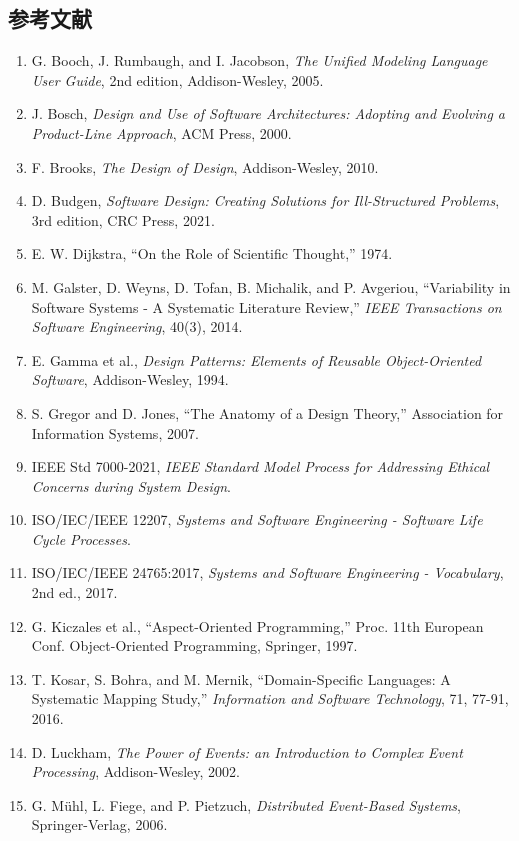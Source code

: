 \subsection{参考文献}

\begin{enumerate}
  \item G. Booch, J. Rumbaugh, and I. Jacobson, \textit{The Unified Modeling Language User Guide}, 2nd edition, Addison-Wesley, 2005.
  \item J. Bosch, \textit{Design and Use of Software Architectures: Adopting and Evolving a Product-Line Approach}, ACM Press, 2000.
  \item F. Brooks, \textit{The Design of Design}, Addison-Wesley, 2010.
  \item D. Budgen, \textit{Software Design: Creating Solutions for Ill-Structured Problems}, 3rd edition, CRC Press, 2021.
  \item E. W. Dijkstra, “On the Role of Scientific Thought,” 1974.
  \item M. Galster, D. Weyns, D. Tofan, B. Michalik, and P. Avgeriou, “Variability in Software Systems - A Systematic Literature Review,” \textit{IEEE Transactions on Software Engineering}, 40(3), 2014.
  \item E. Gamma et al., \textit{Design Patterns: Elements of Reusable Object-Oriented Software}, Addison-Wesley, 1994.
  \item S. Gregor and D. Jones, “The Anatomy of a Design Theory,” Association for Information Systems, 2007.
  \item IEEE Std 7000-2021, \textit{IEEE Standard Model Process for Addressing Ethical Concerns during System Design}.
  \item ISO/IEC/IEEE 12207, \textit{Systems and Software Engineering - Software Life Cycle Processes}.
  \item ISO/IEC/IEEE 24765:2017, \textit{Systems and Software Engineering - Vocabulary}, 2nd ed., 2017.
  \item G. Kiczales et al., “Aspect-Oriented Programming,” Proc. 11th European Conf. Object-Oriented Programming, Springer, 1997.
  \item T. Kosar, S. Bohra, and M. Mernik, “Domain-Specific Languages: A Systematic Mapping Study,” \textit{Information and Software Technology}, 71, 77-91, 2016.
  \item D. Luckham, \textit{The Power of Events: an Introduction to Complex Event Processing}, Addison-Wesley, 2002.
  \item G. Mühl, L. Fiege, and P. Pietzuch, \textit{Distributed Event-Based Systems}, Springer-Verlag, 2006.

\end{enumerate}
